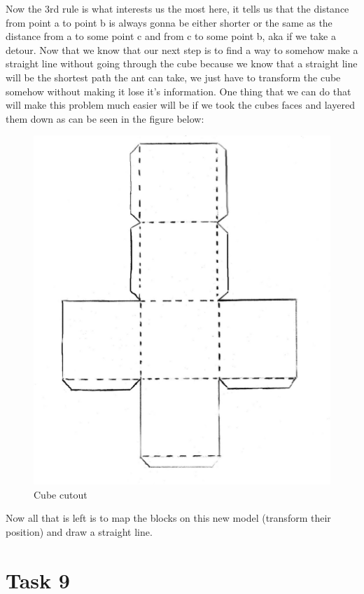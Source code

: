 \documentclass[a4paper, 10pt]{article}
\begin{document}
			\noindent Now the 3rd rule is what interests us the most here, it tells us that the distance from point a to point b is always gonna be either shorter or the same as the distance from a to some point c and from c to some point b, aka if we take a detour. Now that we know that our next step is to find a way to somehow make a straight line without going through the cube because we know that a straight line will be the shortest path the ant can take, we just have to transform the cube somehow without making it lose it's information. One thing that we can do that will make this problem much easier will be if we took the cubes faces and layered them down as can be seen in the figure below:
			
			\begin{figure}[h]
				\centering
				\includegraphics[scale = .05]{CubeCutOut}
				\caption{Cube cutout}
				\label{fig:Cube cut out}
			\end{figure}
		
			\noindent Now all that is left is to map the blocks on this new model (transform their position) and draw a straight line.
	\section{Task 9}
	
\end{document}
